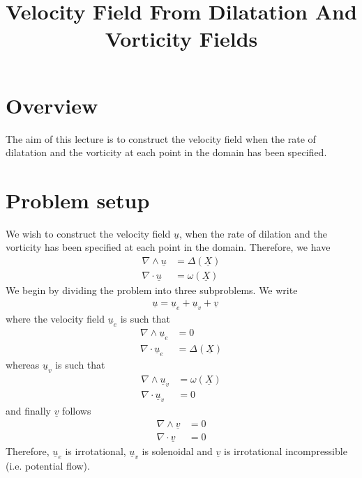 \documentclass[11pt,a4paper]{article}
\title{Velocity Field From Dilatation And Vorticity Fields}
\date{\displaydate{date}}
\author{}
\newcommand{\vect}[1]{\underline{#1}}
\newcommand{\1}{\vect{1}}
\newcommand{\curl}[1]{\nabla\wedge\vect{#1}}
\newcommand{\divg}[1]{\nabla\cdot\vect{#1}}
\begin{document}
\maketitle
\section*{Overview}

The aim of this lecture is to construct the velocity field when the rate of dilatation and the vorticity at each point in the domain has been specified. 

\section{Problem setup}
We wish to construct the velocity field $\vect u$, when the rate of dilation and the vorticity has been specified at each point in the domain. Therefore, we have
\begin{align*}
\curl u &= \Delta(\vect X)\\
\divg u &= \omega(\vect X)
\end{align*}
We begin by dividing the problem into three subproblems. We write
\begin{align*}
&\vect u = \vect u_e + \vect u_v + \vect v
\end{align*}
where the velocity field $\vect u_e$ is such that
\begin{align*}
\curl u_e &= 0\\
\divg u_e &= \Delta(\vect X)
\end{align*}
whereas $\vect u_v$ is such that
\begin{align*}
\curl u_v &= \omega(\vect X)\\
\divg u_v &= 0
\end{align*}
and finally $\vect v$ follows
\begin{align*}
\curl v &= 0\\
\divg v &= 0
\end{align*}
Therefore, $\vect u_e$ is irrotational, $\vect u_v$ is solenoidal and $\vect v$ is irrotational incompressible (i.e. potential flow). 
\end{document}
